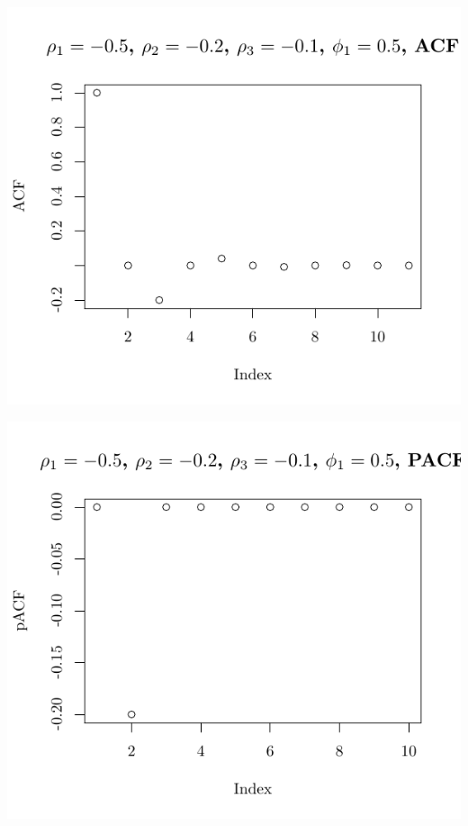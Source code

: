 \documentclass[10pt]{paper}\usepackage[]{graphicx}\usepackage[]{color}
\makeatletter
\def\maxwidth{ %
  \ifdim\Gin@nat@width>\linewidth
    \linewidth
  \else
    \Gin@nat@width
  \fi
}
\newenvironment{knitrout}{}{} %
\makeatother
\begin{document}
\begin{knitrout}
{\centering \includegraphics[width=\maxwidth]{figure/graphics-plotter-115} 

}




{\centering \includegraphics[width=\maxwidth]{figure/graphics-plotter-116} 

}





\end{knitrout}
\end{document}
